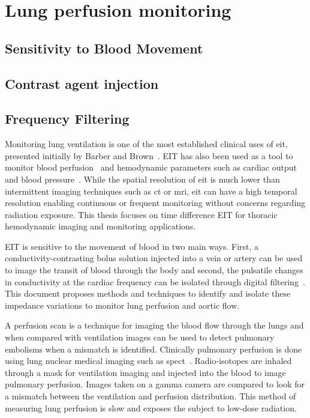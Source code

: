 
\section{Lung perfusion monitoring}
\subsection{Sensitivity to Blood Movement}
\subsection{Contrast agent injection}
\subsection{Frequency Filtering}


Monitoring lung ventilation is one of the most
established clinical uses of 
\acrshort{eit}, presented initially by Barber and Brown~\parencite{Barber1984}.
EIT has also been used as a tool to monitor blood 
perfusion~\parencite{Brown1992} and hemodynamic parameters such as 
cardiac output~\parencite{Braun2018} and blood pressure~\parencite{Sola2011,Proenca2017}. 
While the spatial resolution of \acrshort{eit} is much lower than 
intermittent imaging techniques such as \acrfull{ct} or \acrfull{mri},
\acrshort{eit} can have a high temporal resolution enabling continuous or frequent 
monitoring without concerns regarding radiation exposure.
This thesis focuses on time difference EIT for thoracic hemodynamic imaging and monitoring applications. 

EIT is sensitive to the movement of blood in two main ways. First, a conductivity-contrasting 
bolus solution injected into a vein or artery can be used to image the transit of blood through the body
and second, the pulsatile changes in conductivity at the cardiac frequency can be isolated 
through digital filtering~\parencite{Leathard1994}.
This document proposes methods and techniques to identify and isolate these impedance variations
to monitor lung perfusion and 
aortic flow.

A perfusion scan is a technique for imaging the blood flow through the lungs
and when compared with ventilation images can be used to detect pulmonary embolisms
when a mismatch is identified. Clinically pulmonary perfusion is done using 
lung nuclear medical imaging such as \acrfull{spect}~\parencite{Parker2012}. Radio-isotopes are inhaled through a mask 
for ventilation imaging and injected into the blood to image pulmonary perfusion. 
Images taken on a gamma camera are compared to look for a mismatch between the ventilation
and perfusion distribution. This method of 
measuring lung perfusion is slow and exposes the subject to low-dose radiation.

